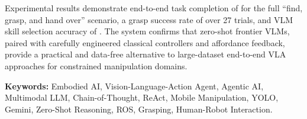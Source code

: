 Experimental results demonstrate end-to-end task completion of  for the full
``find, grasp, and hand over'' scenario, a grasp success rate of  over 27
trials, and VLM skill selection accuracy of .
The system confirms that zero-shot frontier VLMs, paired with carefully engineered
classical controllers and affordance feedback, provide a practical and data-free
alternative to large-dataset end-to-end VLA approaches for constrained manipulation
domains.

\vspace{1em}
\noindent\textbf{Keywords:} Embodied AI, Vision-Language-Action Agent, Agentic AI,
Multimodal LLM, Chain-of-Thought, ReAct, Mobile Manipulation, YOLO, Gemini,
Zero-Shot Reasoning, ROS, Grasping, Human-Robot Interaction.
